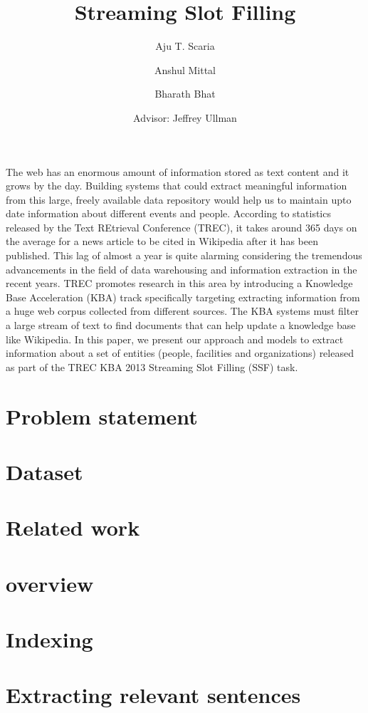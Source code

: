 \documentclass[11pt]{article}
\begin{document}
\title{Streaming Slot Filling}
\author{Aju T. Scaria \and Anshul Mittal \and Bharath Bhat \\
 {  }\and Advisor: Jeffrey Ullman \and {  }}
\renewcommand{\today}{June 10, 2013}
\maketitle
The web has an enormous amount of information stored as text content and it grows by the day. Building systems that could  extract meaningful information from this large, freely available data repository would help us to maintain upto date information about different events and people. According to statistics released by the Text REtrieval Conference (TREC), it takes around 365 days on the average for a news article to be cited in Wikipedia after it has been published. This lag of almost a year is quite alarming considering the tremendous advancements in the field of data warehousing and information extraction in the recent years. TREC promotes research in this area by introducing a Knowledge Base Acceleration (KBA) track specifically targeting extracting information from a huge web corpus collected from different sources. The KBA systems must filter a large stream of text to find documents that can help update a knowledge base like Wikipedia. In this paper, we present our approach and models to extract information about a set of entities (people, facilities and organizations) released as part of the TREC KBA 2013 Streaming Slot Filling (SSF) task.
\section{Problem statement}

\section{Dataset}

\section{Related work}

\section{overview}

\section{Indexing}

\section{Extracting relevant sentences}

\end{document}
